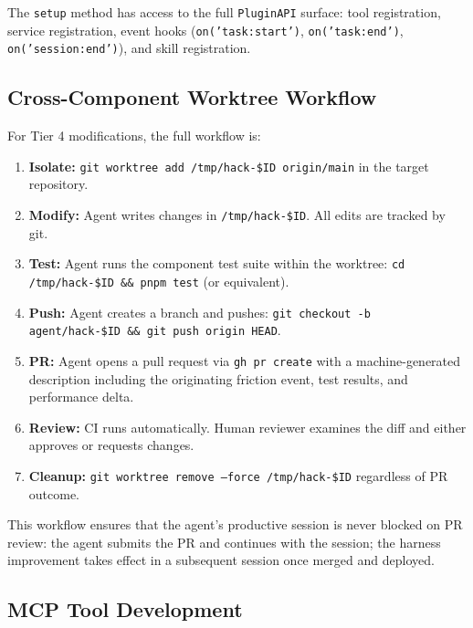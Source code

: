 The \texttt{setup} method has access to the full \texttt{PluginAPI} surface:
tool registration, service registration, event hooks (\texttt{on('task:start')},
\texttt{on('task:end')}, \texttt{on('session:end')}), and skill registration.

\subsection{Cross-Component Worktree Workflow}
\label{sec:worktree-workflow}

For Tier 4 modifications, the full workflow is:

\begin{enumerate}[leftmargin=1.5em]
    \item \textbf{Isolate:} \texttt{git worktree add /tmp/hack-\$ID origin/main}
          in the target repository.
    \item \textbf{Modify:} Agent writes changes in \texttt{/tmp/hack-\$ID}.
          All edits are tracked by git.
    \item \textbf{Test:} Agent runs the component test suite within the worktree:
          \texttt{cd /tmp/hack-\$ID \&\& pnpm test} (or equivalent).
    \item \textbf{Push:} Agent creates a branch and pushes:
          \texttt{git checkout -b agent/hack-\$ID \&\& git push origin HEAD}.
    \item \textbf{PR:} Agent opens a pull request via \texttt{gh pr create}
          with a machine-generated description including the originating friction
          event, test results, and performance delta.
    \item \textbf{Review:} CI runs automatically. Human reviewer examines the
          diff and either approves or requests changes.
    \item \textbf{Cleanup:} \texttt{git worktree remove --force /tmp/hack-\$ID}
          regardless of PR outcome.
\end{enumerate}

This workflow ensures that the agent's productive session is never blocked on
PR review: the agent submits the PR and continues with the session; the harness
improvement takes effect in a subsequent session once merged and deployed.

\subsection{MCP Tool Development}
\label{sec:mcp-tools}

